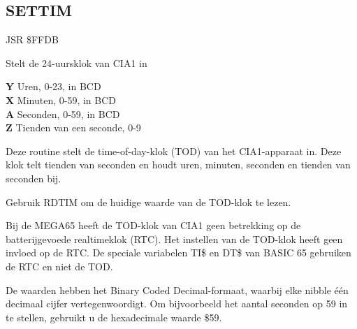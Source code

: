 \subsection{SETTIM}
\label{KERNAL Jump Table!SETTIM}
\begin{description}[leftmargin=2cm,style=nextline]
    \item [Adres:] JSR \$FFDB    \item [Omschrijving:] Stelt de 24-uursklok van CIA1 in    \item [Invoer:]        \textbf{Y} Uren, 0-23, in BCD \\        \textbf{X} Minuten, 0-59, in BCD \\        \textbf{A} Seconden, 0-59, in BCD \\        \textbf{Z} Tienden van een seconde, 0-9    \item [Opmerkingen:]        Deze routine stelt de time-of-day-klok (TOD) van het CIA1-apparaat in. Deze klok telt tienden van seconden en houdt uren, minuten, seconden en tienden van seconden bij.

        Gebruik RDTIM om de huidige waarde van de TOD-klok te lezen.

        Bij de MEGA65 heeft de TOD-klok van CIA1 geen betrekking op de batterijgevoede realtimeklok (RTC). Het instellen van de TOD-klok heeft geen invloed op de RTC. De speciale variabelen TI\$ en DT\$ van BASIC 65 gebruiken de RTC en niet de TOD.

        De waarden hebben het Binary Coded Decimal-formaat, waarbij elke nibble één decimaal cijfer vertegenwoordigt. Om bijvoorbeeld het aantal seconden op 59 in te stellen, gebruikt u de hexadecimale waarde \$59.    \item [Voorbeeld:]
\end{description}



\newpage
